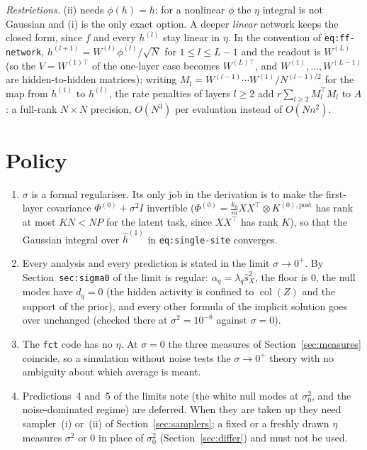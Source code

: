 \documentclass[11pt,a4paper]{article}
\newcommand{\col}{\operatorname{col}}
\newcommand{\sX}{\hat s_X^2}
\theoremstyle{remark}
\begin{document}
\emph{Restrictions.} (ii) needs $\phi(h) = h$: for a nonlinear $\phi$ the
$\eta$ integral is not Gaussian and (i) is the only exact option. A deeper
\emph{linear} network keeps the closed form, since $f$ and every $h^{(l)}$
stay linear in $\eta$. In the convention of \texttt{eq:ff-network},
$h^{(l+1)} = W^{(l)}\phi^{(l)}/\sqrt N$ for $1\le l\le L-1$ and the readout
is $W^{(L)}$ (so the $V = W^{(1)\top}$ of the one-layer case becomes
$W^{(L)\top}$, and $W^{(1)},\dots,W^{(L-1)}$ are hidden-to-hidden matrices);
writing $M_l = W^{(l-1)}\cdots W^{(1)}/N^{(l-1)/2}$ for the map from
$h^{(1)}$ to $h^{(l)}$, the rate penalties of layers $l\ge2$ add
$r\sum_{l\ge2}M_l^\top M_l$ to $A$: a full-rank $N\times N$ precision,
$O(N^3)$ per evaluation instead of $O(Nn^2)$.

\section{Policy}
\label{sec:policy}

\begin{enumerate}[nosep]
  \item $\sigma$ is a formal regulariser. Its only job in the derivation is to
    make the first-layer covariance $\Phi^{(0)} + \sigma^2 I$ invertible
    ($\Phi^{(0)} = \frac{k_0}{m}XX^\top\otimes K^{(0),\mathrm{post}}$ has rank at
    most $KN < NP$ for the latent task, since $XX^\top$ has rank $K$),
    so that the Gaussian integral over $\hat h^{(1)}$ in
    \texttt{eq:single-site} converges.
  \item Every analysis and every prediction is stated in the limit
    $\sigma\to0^+$. By Section~\texttt{sec:sigma0} of
     the limit is regular:
    $\alpha_q = \lambda_q\sX$, the floor is $0$, the null modes have
    $d_q = 0$ (the hidden activity is confined to $\col(Z)$ and the support of
    the prior), and every other formula of the implicit solution goes over
    unchanged (checked there at $\sigma^2 = 10^{-8}$ against $\sigma = 0$).
  \item The \texttt{fct} code has no $\eta$. At $\sigma = 0$ the three measures
    of Section~\ref{sec:measures} coincide, so a simulation without noise
    tests the $\sigma\to0^+$ theory with no ambiguity about which average is
    meant.
  \item Predictions~4 and~5 of the limits note (the white null modes at
    $\sigma_0^2$, and the noise-dominated regime) are deferred. When they are
    taken up they need sampler~(i) or~(ii) of Section~\ref{sec:samplers};
    a fixed or a freshly drawn $\eta$ measures $\sigma^2$ or $0$ in place of
    $\sigma_0^2$ (Section~\ref{sec:differ}) and must not be used.
\end{enumerate}
\end{document}
